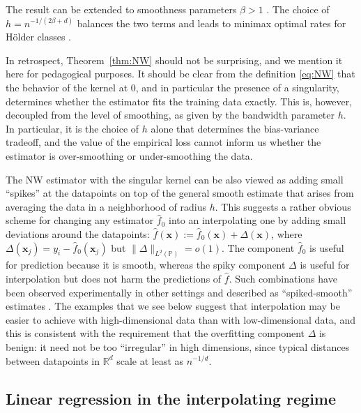 The result can be extended to smoothness parameters $\beta>1$
\cite{belkin2019does}. The choice of $h=n^{-1/(2\beta+d)}$
balances the two terms and leads to minimax optimal rates for H\"older classes \cite{tsybakov2008introduction}. 

In retrospect, Theorem~\ref{thm:NW} should not be surprising, and we mention it here for pedagogical purposes. It should be clear from the definition \eqref{eq:NW} that the behavior of the kernel at $0$, and in particular the presence of a singularity, determines whether the estimator fits the training data exactly. This is, however, decoupled from the level of smoothing, as given by the bandwidth parameter $h$.  In particular, it is the choice of $h$ alone that determines the bias-variance tradeoff, and the value of the empirical loss cannot inform us whether the estimator is over-smoothing or under-smoothing the data.

The NW estimator with the singular kernel can be also viewed as adding small ``spikes'' at the datapoints on top of the general smooth estimate that arises from averaging the data in a neighborhood of radius $h$.  This suggests a rather obvious scheme for changing any estimator $\widehat{f}_0$ into an interpolating one by adding small deviations around the datapoints: $\widehat{f}({\boldsymbol x}) := \widehat{f}_0({\boldsymbol x}) + \Delta({\boldsymbol x})$, where $\Delta({\boldsymbol x}_j)=y_i-\widehat{f}_0({\boldsymbol x}_j)$ but
$\|\Delta\|_{L^2(\mathbb{P})}=o(1)$.  The component $\widehat{f}_0$ is useful for prediction because it is smooth, whereas the spiky component $\Delta$ is useful for interpolation but does not harm the predictions of $\widehat{f}$. Such combinations have been observed experimentally in other settings and described as ``spiked-smooth'' estimates \cite{wyner2017explaining}.  The examples that we see below suggest that interpolation may be easier to achieve with high-dimensional data than with low-dimensional data, and this is consistent with the requirement that the overfitting component
$\Delta$ is benign: it need not be too ``irregular'' in high dimensions, since typical distances between datapoints in ${\mathbb R}^d$ scale at least as $n^{-1/d}$.

\subsection{Linear regression in the interpolating regime}
\label{sec:lin_regression}

